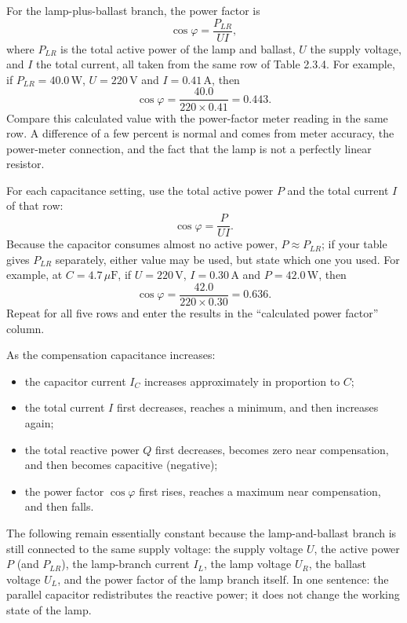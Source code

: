 \documentclass[11pt]{ctexart}
\begin{document}
For the lamp-plus-ballast branch, the power factor is
\[
\cos\varphi=\frac{P_{LR}}{UI},
\]
where \(P_{LR}\) is the total active power of the lamp and ballast, \(U\) the supply voltage, and \(I\) the total current, all taken from the same row of Table 2.3.4. For example, if \(P_{LR}=40.0\,\mathrm{W}\), \(U=220\,\mathrm{V}\) and \(I=0.41\,\mathrm{A}\), then
\[
\cos\varphi=\frac{40.0}{220\times0.41}=0.443 .
\]
Compare this calculated value with the power-factor meter reading in the same row. A difference of a few percent is normal and comes from meter accuracy, the power-meter connection, and the fact that the lamp is not a perfectly linear resistor.

For each capacitance setting, use the total active power \(P\) and the total current \(I\) of that row:
\[
\cos\varphi=\frac{P}{UI}.
\]
Because the capacitor consumes almost no active power, \(P\approx P_{LR}\); if your table gives \(P_{LR}\) separately, either value may be used, but state which one you used. For example, at \(C=4.7\,\mu\mathrm{F}\), if \(U=220\,\mathrm{V}\), \(I=0.30\,\mathrm{A}\) and \(P=42.0\,\mathrm{W}\), then
\[
\cos\varphi=\frac{42.0}{220\times0.30}=0.636 .
\]
Repeat for all five rows and enter the results in the ``calculated power factor'' column.

As the compensation capacitance increases:
\begin{itemize}
  \item the capacitor current \(I_C\) increases approximately in proportion to \(C\);
  \item the total current \(I\) first decreases, reaches a minimum, and then increases again;
  \item the total reactive power \(Q\) first decreases, becomes zero near compensation, and then becomes capacitive (negative);
  \item the power factor \(\cos\varphi\) first rises, reaches a maximum near compensation, and then falls.
\end{itemize}
The following remain essentially constant because the lamp-and-ballast branch is still connected to the same supply voltage: the supply voltage \(U\), the active power \(P\) (and \(P_{LR}\)), the lamp-branch current \(I_L\), the lamp voltage \(U_R\), the ballast voltage \(U_L\), and the power factor of the lamp branch itself. In one sentence: the parallel capacitor redistributes the reactive power; it does not change the working state of the lamp.
\end{document}
